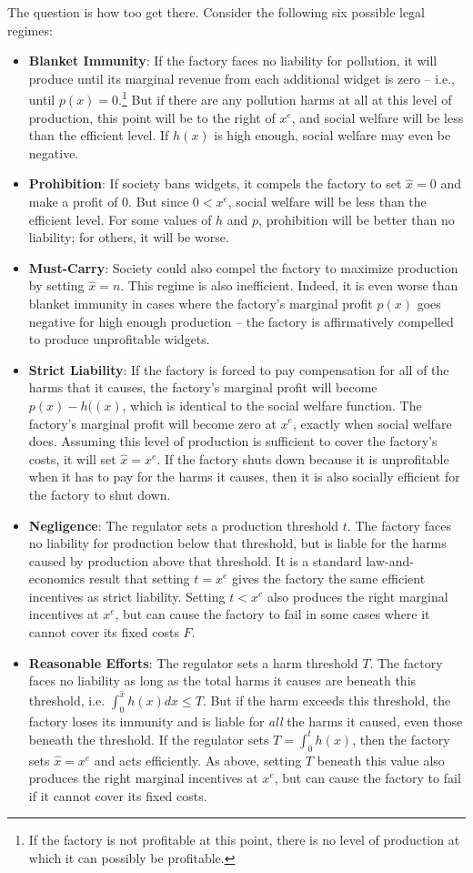 The question is how too get there. Consider the following six possible legal regimes:
\begin{itemize}
\item \textbf{Blanket Immunity}: If the factory faces no liability for pollution, it will produce until its marginal revenue from each additional widget is zero -- i.e., until $p(x) = 0$.\footnote{If the factory is not profitable at this point, there is no level of production at which it can possibly be profitable.} But if there are any pollution harms at all at this level of production, this point will be to the right of $x^e$, and social welfare will be less than the efficient level. If $h(x)$ is high enough, social welfare may even be negative.
\item \textbf{Prohibition}: If society bans widgets, it compels the factory to set $\hat{x} = 0$ and make a profit of $0$. But since $0 < x^e$, social welfare will be less than the efficient level. For some values of $h$ and $p$, prohibition will be better than no liability; for others, it will be worse.
\item \textbf{Must-Carry}: Society could also compel the factory to maximize production by setting $\hat{x} = n$. This regime is also inefficient. Indeed, it is even worse than blanket immunity in cases where the factory's marginal profit $p(x)$ goes negative for high enough production -- the factory is affirmatively compelled to produce unprofitable widgets. 
\item \textbf{Strict Liability}: If the factory is forced to pay compensation for all of the harms that it causes, the factory's marginal profit will become $p(x) - h((x)$, which is identical to the social welfare function. The factory's marginal profit will become zero at $x^e$, exactly when social welfare does. Assuming this level of production is sufficient to cover the factory's costs, it will set $\hat{x} = x^e$. If the factory shuts down because it is unprofitable when it has to pay for the harms it causes, then it is also socially efficient for the factory to shut down.
\item \textbf{Negligence}: The regulator sets a production threshold $t$. The factory faces no liability for production below that threshold, but is liable for the harms caused by production above that threshold. It is a standard law-and-economics result that setting $t = x^e$ gives the factory the same efficient incentives as strict liability. Setting $t < x^e$ also produces the right marginal incentives at $x^e$, but can cause the factory to fail in some cases where it cannot cover its fixed costs $F$.
\item \textbf{Reasonable Efforts}: The regulator sets a harm threshold $T$. The factory faces no liability as long as the total harms it causes are beneath this threshold, i.e. $\int_0^{\hat{x}} h(x) dx \le T$. But if the harm exceeds this threshold, the factory loses its immunity and is liable for \emph{all} the harms it caused, even those beneath the threshold. If the regulator sets $T = \int_0^{t} h(x)$, then the factory sets $\hat{x} = x^e$ and acts efficiently. As above, setting $T$ beneath this value also produces the right marginal incentives at $x^e$, but can cause the factory to fail if it cannot cover its fixed costs.
\end{itemize}
